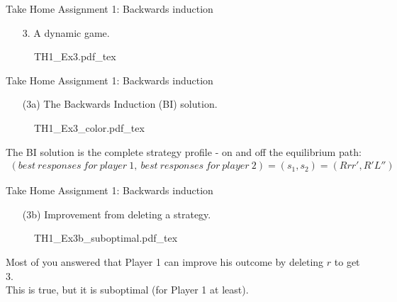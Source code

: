 \begin{frame}{Take Home Assignment 1: Backwards induction}
  \begin{itemize}
    \item[3.] A dynamic game.
  \end{itemize}
  \begin{figure}[!h]
    \begin{center}
    \def\svgwidth{\columnwidth}
    {TH1_Ex3.pdf_tex}
    \end{center}
  \end{figure}
\end{frame}
\begin{frame}{Take Home Assignment 1: Backwards induction}
  \begin{itemize}
    \item[(3a)] The Backwards Induction (BI) solution.
  \end{itemize}
  \begin{figure}[!h]
    \begin{center}
    \def\svgwidth{\columnwidth}
    {TH1_Ex3_color.pdf_tex}
    \end{center}
  \end{figure}
  The BI solution is the complete strategy profile - on and off the equilibrium path:
  \begin{align*}
    (best\ responses\ for\ player\ 1,\ best\ responses\ for\ player\ 2)=(s_1,s_2)=(Rrr',R'L'')
  \end{align*}
\end{frame}
\begin{frame}{Take Home Assignment 1: Backwards induction}
  \begin{itemize}
    \item[(3b)] Improvement from deleting a strategy.
  \end{itemize}
  \begin{figure}[!h]
    \begin{center}
    \def\svgwidth{\columnwidth}
    {TH1_Ex3b_suboptimal.pdf_tex}
    \end{center}
  \end{figure}
  Most of you answered that Player 1 can improve his outcome by deleting $r$ to get 3.\\\medskip
  This is true, but it is suboptimal (for Player 1 at least).
\end{frame}
